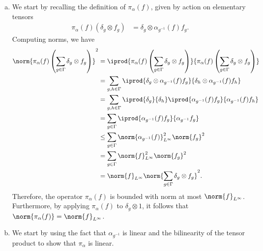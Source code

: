 \documentclass[10pt]{mypackage}
\begin{document}
\begin{solution}\hfill
  \begin{enumerate}[(a)]
    \item We start by recalling the definition of $\pi_{\alpha}(f)$, given by action on elementary tensors
      \begin{align*}
        \pi_{\alpha}(f) \left( \delta_g\otimes f_g \right) &= \delta_g \otimes \alpha_{g^{-1}}(f)f_g.
      \end{align*}
      Computing norms, we have
      \begin{align*}
        \norm{\pi_{\alpha}(f)\left( \sum_{g\in \Gamma}\delta_g\otimes f_g \right)}^2 &= \iprod{\pi_{\alpha}(f)\left( \sum_{g\in \Gamma}\delta_g\otimes f_g \right)}{\pi_{\alpha}(f)\left( \sum_{g\in\Gamma}\delta_g\otimes f_g \right)}\\
                                                                                     &= \sum_{g,h\in\Gamma} \iprod{\delta_g\otimes \alpha_{g^{-1}}(f)f_g}{\delta_h\otimes \alpha_{g^{-1}}(f)f_h}\\
                                                                                     &= \sum_{g,h\in\Gamma} \iprod{\delta_g}{\delta_h} \iprod{\alpha_{g^{-1}}(f)f_g}{\alpha_{g^{-1}}(f)f_h}\\
                                                                                     &= \sum_{g\in\Gamma} \iprod{\alpha_{g^{-1}}(f)f_g}{\alpha_{g^{-1}}f_g}\\
                                                                                     &\leq \sum_{g\in\Gamma} \norm{\alpha_{g^{-1}}(f)}_{L^{\infty}}^2 \norm{f_g}^2\\
                                                                                     &= \sum_{g\in\Gamma} \norm{f}_{L^{\infty}}^2\norm{f_g}^2\\
                                                                                     &= \norm{f}_{L^{\infty}} \norm{\sum_{g\in \Gamma}\delta_g\otimes f_g}^2.
      \end{align*}
      Therefore, the operator $\pi_{\alpha}(f)$ is bounded with norm at most $\norm{f}_{L^{\infty}}$. Furthermore, by applying $\pi_{\alpha}(f)$ to $\delta_g\otimes 1$, it follows that $\norm{\pi_{\alpha}(f)} = \norm{f}_{L^{\infty}}$.
    \item We start by using the fact that $\alpha_{g^{-1}}$ is linear and the bilinearity of the tensor product to show that $\pi_{\alpha}$ is linear.


\end{enumerate}
\end{solution}
\end{document}
